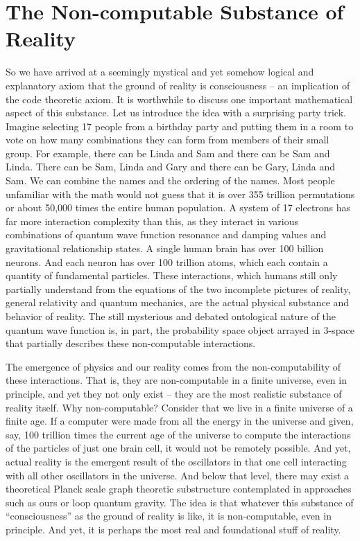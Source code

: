 \documentclass[submission,copyright,creativecommons]{eptcs}
\begin{document}
\section{The Non-computable Substance of Reality}
\label{sec:10}
So we have arrived at a seemingly mystical and yet somehow logical and explanatory axiom that the ground of reality is consciousness -- an implication of the code theoretic axiom. It is worthwhile to discuss one important mathematical aspect of this substance. Let us introduce the idea with a surprising party trick. Imagine selecting 17 people from a birthday party and putting them in a room to vote on how many combinations they can form from members of their small group. For example, there can be Linda and Sam and there can be Sam and Linda. There can be Sam, Linda and Gary and there can be Gary, Linda and Sam. We can combine the names and the ordering of the names. Most people unfamiliar with the math would not guess that it is over 355 trillion permutations or about 50,000 times the entire human population. A system of 17 electrons has far more interaction complexity than this, as they interact in various combinations of quantum wave function resonance and damping values and gravitational relationship states. A single human brain has over 100 billion neurons. And each neuron has over 100 trillion atoms, which each contain a quantity of fundamental particles. These interactions, which humans still only partially understand from the equations of the two incomplete pictures of reality, general relativity and quantum mechanics, are the actual physical substance and behavior of reality. The still mysterious and debated ontological nature of the quantum wave function is, in part, the probability space object arrayed in 3-space that partially describes these non-computable interactions.

The emergence of physics and our reality comes from the non-computability of these interactions. That is, they are non-computable in a finite universe, even in principle, and yet they not only exist -- they are the most realistic substance of reality itself. Why non-computable? Consider that we live in a finite universe of a finite age. If a computer were made from all the energy in the universe and given, say, 100 trillion times the current age of the universe to compute the interactions of the particles of just one brain cell, it would not be remotely possible. And yet, actual reality is the emergent result of the oscillators in that one cell interacting with all other oscillators in the universe. And below that level, there may exist a theoretical Planck scale graph theoretic substructure contemplated in approaches such as ours or loop quantum gravity. The idea is that whatever this substance of “consciousness” as the ground of reality is like, it is non-computable, even in principle. And yet, it is perhaps the most real and foundational stuff of reality.
\end{document}
